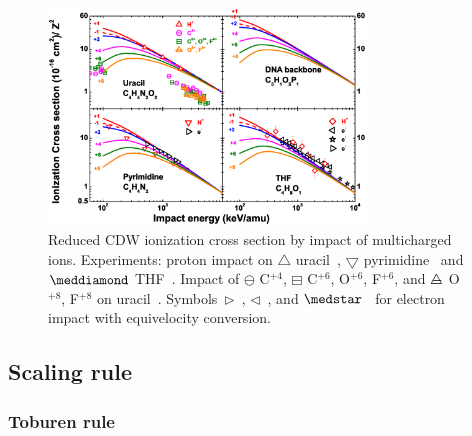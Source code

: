 \documentclass[preprint]{revtex4-2}
\begin{document}
\begin{figure}[t!]
\centering
\includegraphics[width=0.75\textwidth]{figuras/Fig_finales/fig3.eps}
\caption{Reduced CDW ionization cross section by impact of multicharged 
ions. Experiments: proton impact on $\triangle$ uracil~\cite{itoh2013}, 
$\bigtriangledown$ pyrimidine~\cite{wolff2014} and $\meddiamond$
THF~\cite{wang2016}. Impact of $\ominus$ C$^{+4}$, 
$\boxminus$ C$^{+6}$, O$^{+6}$, F$^{+6}$, and
$\triangle\mkern-14mu-$ O$^{+8}$, F$^{+8}$ on 
uracil~\cite{agnihotri2012,agnihotri2013}. 
Symbols~$\rhd$~\cite{bug2017}, $\lhd$~\cite{wolf2019}, and 
$\medstar$~\cite{fuss2009} for electron impact with equivelocity 
conversion.}
\label{fig:crossDNA_2}
\end{figure} 

\subsection{Scaling rule}
\label{subsec:scaling}
\subsubsection{Toburen rule}
\end{document}
